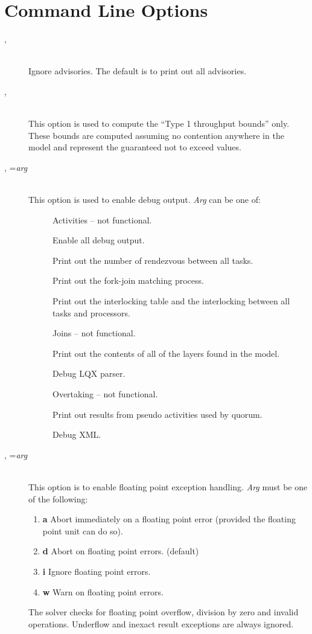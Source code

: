 \section{Command Line Options}
\label{sec:options}
\begin{description}
\item[, ]~\\
Ignore advisories.  The default is to print out all advisories.
\item[, ]~\\
This option is used to compute the ``Type 1 throughput bounds'' only.
These bounds are computed assuming no contention anywhere in the model
and represent the guaranteed not to exceed values.
\item[, =\emph{arg}]~\\
This option is used to enable debug output.
\emph{Arg} can be one of:
\begin{description}
\item[]
Activities -- not functional.
\item[]
Enable all debug output.
\item[]
Print out the number of rendezvous between all tasks.
\item[]
Print out the fork-join matching process.
\item[]
Print out the interlocking table and the interlocking between all tasks and processors.
\item[]
Joins -- not functional.
\item[]
Print out the contents of all of the layers found in the model.
\item[]
Debug LQX parser.
\item[]
Overtaking -- not functional.
\item[]
Print out results from pseudo activities used by quorum.
\item[]
Debug XML.
\end{description}
\item[, =\emph{arg}]~\\
This option is to enable floating point exception handling.
\emph{Arg} must be one of the following:
\begin{enumerate}
\item \textbf{a}
Abort immediately on a floating point error (provided the floating point unit can do so).
\item \textbf{d}
Abort on floating point errors. (default)
\item \textbf{i}
Ignore floating point errors.
\item \textbf{w}
Warn on floating point errors.
\end{enumerate}
The solver checks for floating point overflow, division by zero and invalid operations.
Underflow and inexact result exceptions are always ignored.



\end{description}
